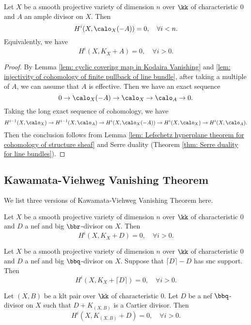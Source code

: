     \begin{theorem}\label{thm: Kodaira Vanishing Theorem}
        Let \(X\) be a smooth projective variety of dimension \(n\) over \(\kk\) of characteristic \(0\) and \(A\) an ample divisor on \(X\). 
        Then
        \[
            H^i(X, \calo_X(-A)) = 0,\quad \forall i < n.
        \]
        Equivalently, we have
        \[
            H^i(X, K_X + A) = 0,\quad \forall i > 0.
        \]
    \end{theorem}
    \begin{proof}
        By Lemma \ref{lem: cyclic covering map in Kodaira Vanishing} and \ref{lem: injectivity of cohomology of finite pullback of line bundle}, after taking a multiple of \(A\), we can assume that \(A\) is effective.
        Then we have an exact sequence
        \[ 0 \to \calo_X(-A) \to \calo_X \to \calo_A \to 0. \]
        Taking the long exact sequence of cohomology, we have
        \[ H^{i-1}(X,\calo_X) \to H^{i-1}(X, \calo_A) \to H^{i}(X, \calo_X(-A)) \to H^{i}(X, \calo_X) \to H^{i}(X, \calo_A). \]
        Then the conclusion follows from Lemma \ref{lem: Lefschetz hyperplane theorem for cohomology of structure sheaf} and Serre duality (Theorem \ref{thm: Serre duality for line bundles}).
    \end{proof}


\subsection{Kawamata-Viehweg Vanishing Theorem}

    We list three versions of Kawamata-Viehweg Vanishing Theorem here.

    \begin{theorem}\label{thm: Kawamata-Viehweg Vanishing Theorem for nef and big divisor}
        Let \(X\) be a smooth projective variety of dimension \(n\) over \(\kk\) of characteristic \(0\) and \(D\) a nef and big \(\bbr\)-divisor on \(X\).
        Then 
        \[ H^i(X, K_X + D) = 0,\quad \forall i > 0. \]
    \end{theorem}
    \begin{theorem}\label{thm: Kawamata-Viehweg Vanishing Theorem in KM98}
        Let \(X\) be a smooth projective variety of dimension \(n\) over \(\kk\) of characteristic \(0\) and \(D\) a nef and big \(\bbq\)-divisor on \(X\).
        Suppose that \(\lceil D \rceil - D\) has snc support.
        Then
        \[
            H^i(X, K_X + \lceil D \rceil) = 0,\quad \forall i > 0.
        \]
    \end{theorem}
    \begin{theorem}\label{thm: Kawamata-Viehweg Vanishing Theorem for klt pair}
        Let \((X,B)\) be a klt pair over \(\kk\) of characteristic \(0\).
        Let \(D\) be a nef \(\bbq\)-divisor on \(X\) such that \(D + K_{(X,B)}\) is a Cartier divisor.
        Then
        \[ H^i(X, K_{(X,B)} + D) = 0,\quad \forall i > 0. \]
    \end{theorem}

